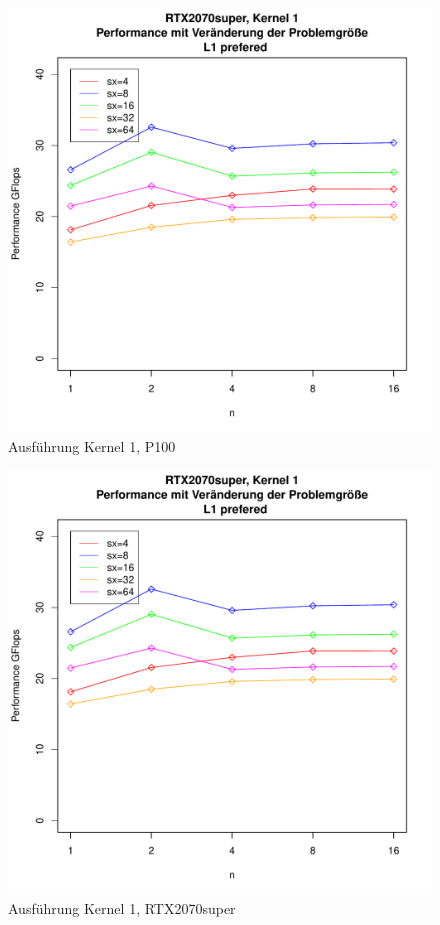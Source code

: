 \documentclass[10pt,a4paper]{article}
\begin{document}
	\begin{figure}
		\includegraphics[page=8,scale=0.8]{../Diagramme/allshared_changei.pdf}
		
		\caption{Ausführung Kernel 1, P100 }
		\label{Ausführung Kernel1, P100 }
	\end{figure}
	
	\begin{figure}
		\includegraphics[page=2,scale=0.8]{../Diagramme/allshared_changei.pdf}
		
		\caption{Ausführung Kernel 1, RTX2070super }
		\label{Ausführung Kernel1, RTX2070super }
	\end{figure}
	
\end{document}
